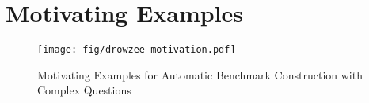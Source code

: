 




\section{Motivating Examples}\label{sec:motivating}


\begin{comment}
\begin{figure}[h]
\centering
\texttt{[image: fig/drowzee-lg-example.pdf]}\\
\caption{Examples of logic programming.
\syh{need to re-draw this picture to me more space-friendly}}
\label{fig:lg-example}
\end{figure}


We use the example shown in \figref{fig:lg-example} for a concrete 
demonstration. 
Here, $\m{member}(\m{Gunzo  Prize}, \m{Haruki Murakami Awards})$, is a fact describing that \emph{Gunzon Prize} is one of the prizes awarded to \emph{Haruki Murakami}.  
With the reasoning rule defined for relation $\m{same\_member(List1, List2)}$, which executes to $\m{true}$ if there exists at least one $\m{element}$ that is a member of both $\m{List1}$ and $\m{List2}$, we can write a query as follows, which asks if there exist any common awards won by both \emph{Haruki Murakami} and \emph{Bob Dylan}. 
\[{?}\text{-}\;  \m{same\_member(HarukiMurakamiAwards, BobDylanAwards)}\]
\end{comment}



\begin{figure*}[!ht]
\centering
\texttt{[image: fig/drowzee-motivation.pdf]}\\
\caption{Motivating Examples for Automatic Benchmark Construction with Complex Questions}
\label{fig:motivating}
\vspace{-0.1cm}
\end{figure*}





